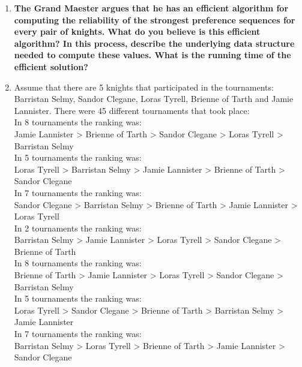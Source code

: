 \documentclass[11pt]{article}
\begin{document}
\begin{enumerate}[label=\textbf{\Alph*.}]
\item \textbf{The Grand Maester argues that he has an
efficient algorithm for computing the reliability of the strongest
preference sequences for every pair of knights. What do you believe is
this efficient algorithm? In this process, describe the underlying
data structure needed to compute these values. What is the running
time of the efficient solution?}\\

\item Assume that there are 5 knights that
participated in the tournaments: Barristan Selmy, Sandor Clegane,
Loras Tyrell, Brienne of Tarth and Jamie Lannister. There were 45
different tournaments that took place:\\

\noindent In 8 tournaments the ranking was:\\ Jamie Lannister > Brienne of Tarth
> Sandor Clegane > Loras Tyrell > Barristan Selmy\\

\noindent In 5 tournaments the ranking was:\\ Loras Tyrell > Barristan Selmy >
Jamie Lannister > Brienne of Tarth > Sandor Clegane\\

\noindent In 7 tournaments the ranking was:\\ Sandor Clegane > Barristan Selmy >
Brienne of Tarth > Jamie Lannister > Loras Tyrell\\

\noindent In 2 tournaments the ranking was:\\ Barristan Selmy > Jamie Lannister >
Loras Tyrell > Sandor Clegane > Brienne of Tarth\\

\noindent In 8 tournaments the ranking was:\\ Brienne of Tarth > Jamie Lannister >
Loras Tyrell > Sandor Clegane > Barristan Selmy\\

\noindent In 5 tournaments the ranking was:\\ Loras Tyrell > Sandor Clegane >
Brienne of Tarth > Barristan Selmy > Jamie Lannister\\

\noindent In 7 tournaments the ranking was:\\ Barristan Selmy > Loras Tyrell >
Brienne of Tarth > Jamie Lannister > Sandor Clegane\\


\end{enumerate}
\end{document}
